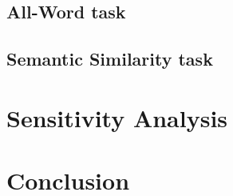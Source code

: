 \documentclass[a4paper, 12pt]{book}
\begin{document}
\section{All-Word task}


\section{Semantic Similarity task}

\chapter{Sensitivity Analysis}

\chapter{Conclusion}


% 

% 
% 



\end{document}
